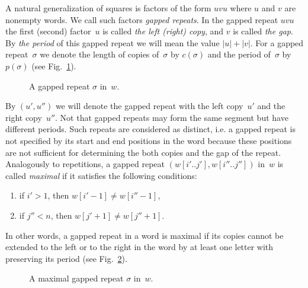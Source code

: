\documentclass{article}
\begin{document}
A natural generalization of squares is factors of the form $uvu$ where $u$ and $v$ are
nonempty words. We call such factors {\it gapped repeats}. In the gapped repeat $uvu$
the first (second) factor~$u$ is called {\it the left (right) copy}, and $v$ is called 
{\it the gap}. By {\it the period} of this gapped repeat we will mean the value $|u|+|v|$.
For a gapped repeat~$\sigma$ we denote the length of copies of~$\sigma$ by $c(\sigma)$
and the period of~$\sigma$ by $p(\sigma)$ (see Fig.~\ref{gaprep}).
\begin{figure}[tb]
\centerline{
}
\caption{A gapped repeat $\sigma$ in~$w$.}
 \label{gaprep}
\end{figure}
By $(u', u'')$ we will denote the gapped repeat with the left copy~$u'$ and the right copy~$u''$.
Not that gapped repeats may form the same segment but have different periods. Such repeats are 
considered as distinct, i.e. a gapped repeat is not specified by its start and end positions in 
the word because these positions are not sufficient for determining the both copies and the gap of
the repeat. Analogously to repetitions, a gapped repeat $(w[i'..j'], w[i''..j''])$ in~$w$ is called 
{\it maximal} if it satisfies the following conditions:
\begin{enumerate}
\item if $i'>1$, then $w[i'-1]\neq w[i''-1]$,
\item if $j''<n$, then $w[j'+1]\neq w[j''+1]$.
\end{enumerate}
In other words, a gapped repeat in a word is maximal if its copies cannot be extended 
to the left or to the right in the word by at least one letter with preserving its period 
(see Fig.~\ref{maxgaprep}).
\begin{figure}[tb]
\centerline{
}
\caption{A maximal gapped repeat $\sigma$ in~$w$.}
 \label{maxgaprep}
\end{figure}
\end{document}
